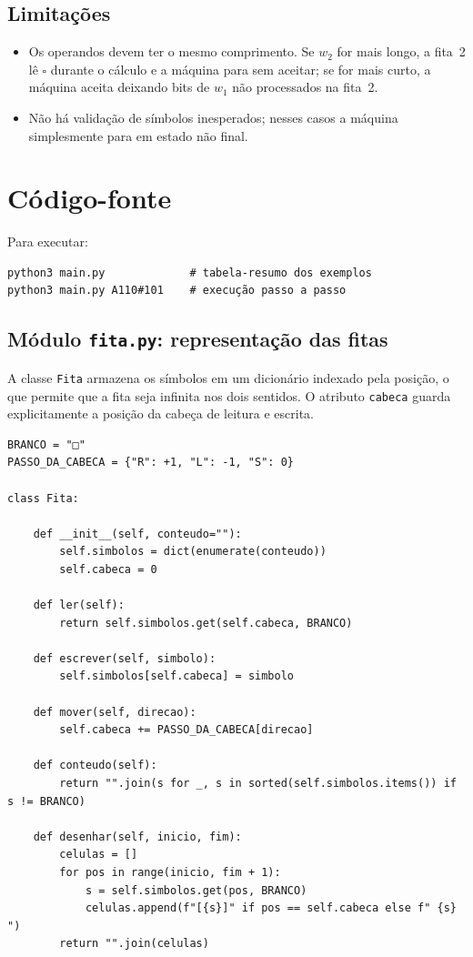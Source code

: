 \documentclass[report, 12pt]{uftreport}
\begin{document}
\section{Limitações}

\begin{itemize}
  \item Os operandos devem ter o mesmo comprimento. Se $w_2$ for mais longo,
        a fita~2 lê $\square$ durante o cálculo e a máquina para sem aceitar;
        se for mais curto, a máquina aceita deixando bits de $w_1$ não
        processados na fita~2.
  \item Não há validação de símbolos inesperados; nesses casos a máquina
        simplesmente para em estado não final.
\end{itemize}


\chapter{Código-fonte}


Para executar:

\begin{lstlisting}[style=terminal]
python3 main.py             # tabela-resumo dos exemplos
python3 main.py A110#101    # execução passo a passo
\end{lstlisting}

\section{Módulo \texttt{fita.py}: representação das fitas}

A classe \texttt{Fita} armazena os símbolos em um dicionário indexado pela posição, o que permite que a fita seja infinita nos dois sentidos. O atributo \texttt{cabeca} guarda explicitamente a posição da cabeça de leitura e escrita.

\begin{lstlisting}[style=python, caption={Módulo \texttt{fita.py}: representação das fitas}, label={lst:fita}]
BRANCO = "□"
PASSO_DA_CABECA = {"R": +1, "L": -1, "S": 0}

class Fita:

    def __init__(self, conteudo=""):
        self.simbolos = dict(enumerate(conteudo))
        self.cabeca = 0

    def ler(self):
        return self.simbolos.get(self.cabeca, BRANCO)

    def escrever(self, simbolo):
        self.simbolos[self.cabeca] = simbolo

    def mover(self, direcao):
        self.cabeca += PASSO_DA_CABECA[direcao]

    def conteudo(self):
        return "".join(s for _, s in sorted(self.simbolos.items()) if s != BRANCO)

    def desenhar(self, inicio, fim):
        celulas = []
        for pos in range(inicio, fim + 1):
            s = self.simbolos.get(pos, BRANCO)
            celulas.append(f"[{s}]" if pos == self.cabeca else f" {s} ")
        return "".join(celulas)
\end{lstlisting}
\end{document}
